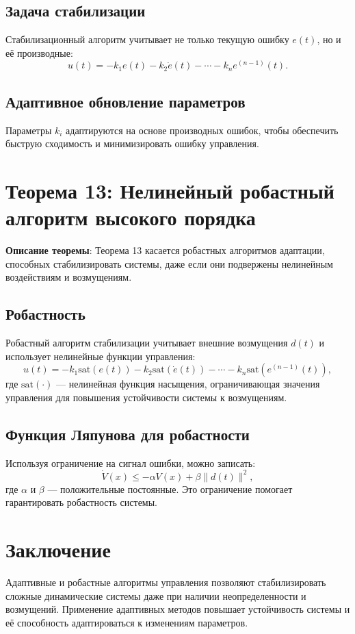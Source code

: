 \documentclass[a4paper,14pt]{extarticle} %
\begin{document}
\subsection*{Задача стабилизации}
Стабилизационный алгоритм учитывает не только текущую ошибку \( e(t) \), но и её производные:
\[
u(t) = -k_1 e(t) - k_2 \dot{e}(t) - \cdots - k_n e^{(n-1)}(t).
\]
\subsection*{Адаптивное обновление параметров}
Параметры \( k_i \) адаптируются на основе производных ошибок, чтобы обеспечить быструю сходимость и минимизировать ошибку управления.

\section{Теорема 13: Нелинейный робастный алгоритм высокого порядка}
\textbf{Описание теоремы}: Теорема 13 касается робастных алгоритмов адаптации, способных стабилизировать системы, даже если они подвержены нелинейным воздействиям и возмущениям.

\subsection*{Робастность}
Робастный алгоритм стабилизации учитывает внешние возмущения \( d(t) \) и использует нелинейные функции управления:
\[
u(t) = -k_1 \text{sat}(e(t)) - k_2 \text{sat}(\dot{e}(t)) - \cdots - k_n \text{sat}(e^{(n-1)}(t)),
\]
где \( \text{sat}(\cdot) \) — нелинейная функция насыщения, ограничивающая значения управления для повышения устойчивости системы к возмущениям.

\subsection*{Функция Ляпунова для робастности}
Используя ограничение на сигнал ошибки, можно записать:
\[
\dot{V}(x) \leq -\alpha V(x) + \beta \|d(t)\|^2,
\]
где \( \alpha \) и \( \beta \) — положительные постоянные. Это ограничение помогает гарантировать робастность системы.

\section*{Заключение}
Адаптивные и робастные алгоритмы управления позволяют стабилизировать сложные динамические системы даже при наличии неопределенности и возмущений. Применение адаптивных методов повышает устойчивость системы и её способность адаптироваться к изменениям параметров.
\end{document}
